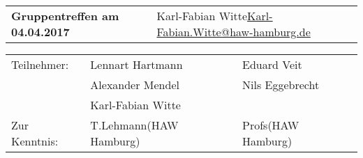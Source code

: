 \documentclass[
   draft=false
  ,paper=a4
  ,twoside=false
  ,fontsize=11pt
  ,headsepline
  ,DIV11
  ,parskip=full+
]{scrartcl} %
\begin{document}
\def\titel{Gruppentreffen am 04.04.2017}

\def\myName{Karl-Fabian Witte}
\def\myEmail{Karl-Fabian.Witte@haw-hamburg.de}


\def\teilnehmer{ 
	& Lennart Hartmann & Eduard Veit \\
	& Alexander Mendel   & Nils Eggebrecht\\
    & Karl-Fabian Witte   & \\
}

\def\zurKenntnis {
	& T.Lehmann(HAW Hamburg) & Profs(HAW Hamburg) \\
}



\newlength{\txtw} %
\setlength{\txtw}{\textwidth} %
\addtolength{\txtw}{-10\tabcolsep} %

\def\me{\myName \newline \footnotesize{\url{\myEmail} } }

\def\tablehead{
	\hline 
	\rowcolor{tabgrey}
	\textbf{Nr.} & 
	\textbf{Art} & 
	\textbf{Stichwort und Beschreibung} & 
	\textbf{Wer} & 
	\textbf{Bis wann} \\
	\hline 
	\endhead}
\begin{tabular}{p{0.65\txtw} p{0.35\txtw}}
	\textbf{\Large{\titel}} & \me  \\
\end{tabular}

\begin{tabular}{l p{0.4\txtw} p{0.4\txtw} }
	Teilnehmer: \teilnehmer
	Zur Kenntnis: \zurKenntnis
\end{tabular}
\end{document}
